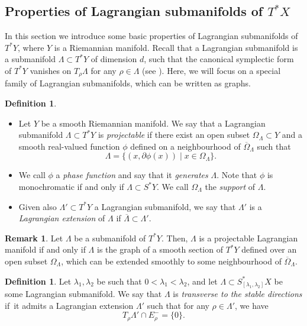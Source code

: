 \documentclass[JEP,XML,SOM,Unicode,published]{cedram}
\let\sep\mid
\theoremstyle{plain}
\theoremstyle{definition}
\newtheorem{definition}[theorem]{Definition}
\newtheorem{remark}[theorem]{Remark}
\begin{document}
\subsection{Properties of Lagrangian submanifolds of $T^*X$}\label{ss:on_lagrangian_submfs}
In this section we introduce some basic properties of Lagrangian submanifolds of $T^*Y$, where $Y$ is a Riemannian manifold. Recall that a Lagrangian submanifold is a submanifold $\Lambda\subset T^*Y$ of dimension $d$, such that the canonical symplectic form of $T^*Y$ vanishes on $T_\rho \Lambda$ for any $\rho \in \Lambda$ (see \cite[Chap.\,1]{DiSj}). Here, we will focus on a special family of Lagrangian submanifolds, which can be written as graphs.

\skpt
\begin{definition}
\begin{itemize}
\item Let $Y$ be a smooth Riemannian manifold. We say that a Lagrangian submanifold $\Lambda\subset T^*Y$ is \emph{projectable} if there exist an open subset $\Omega_\Lambda\subset Y$ and a smooth real-valued function $\phi$ defined on a neighbourhood of $\overline{\Omega}_\Lambda$ such that
\[
\Lambda=\{(x,\partial\phi(x))\sep x\in\Omega_\Lambda\}.
\]
\item We call $\phi$ a \emph{phase function} and say that it \emph{generates} $\Lambda$. Note that $\phi$ is monochromatic if and only if $\Lambda\subset S^*Y$. We call $\Omega_\Lambda$ the \emph{support} of $\Lambda$.
\item Given also $\Lambda'\subset T^*Y$ a Lagrangian submanifold, we say that $\Lambda'$ is a \emph{Lagrangian extension} of $\Lambda$ if $\overline{\Lambda}\subset\Lambda'$.
\end{itemize}
\end{definition}

\begin{remark}\label{Rem:CriterionProj}
Let $\Lambda$ be a submanifold of $T^*Y$. Then, $\Lambda$ is a projectable Lagrangian manifold if and only if $\Lambda$ is the graph of a smooth section of $T^*Y$ defined over an open subset $\Omega_\Lambda$, which can be extended smoothly to some neighbourhood of $\overline{\Omega}_\Lambda$.
\end{remark}

\begin{definition}\label{def:transverse_to_stable_directions}
Let $\lambda_1,\lambda_2$ be such that $0<\lambda_1<\lambda_2$, and let $\Lambda \subset S^*_{[\lambda_1,\lambda_2]}X$ be some Lagrangian submanifold. We say that $\Lambda$ is \emph{transverse to the stable directions} if~it admits a Lagrangian extension $\Lambda'$ such that for any $\rho\in \Lambda'$, we have
\[
T_\rho \Lambda' \cap E_\rho^- = \{0\}.
\]
\end{definition}
\end{document}
